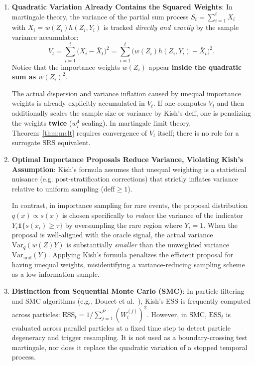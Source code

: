 \documentclass[11pt,a4paper]{article}
\begin{document}
\begin{enumerate}[leftmargin=*]
    \item \textbf{Quadratic Variation Already Contains the Squared Weights}:
    In martingale theory, the variance of the partial sum process $S_t = \sum_{i=1}^t X_i$ with $X_i = w(Z_i) h(Z_i, Y_i)$ is tracked \emph{directly and exactly} by the sample variance accumulator:
    \begin{equation}\label{eq:vt_exact}
    V_t = \sum_{i=1}^t \big( X_i - \bar{X}_t \big)^2 = \sum_{i=1}^t \Big( w(Z_i) h(Z_i, Y_i) - \bar{X}_t \Big)^2.
    \end{equation}
    Notice that the importance weights $w(Z_i)$ appear \textbf{inside the quadratic sum as $w(Z_i)^2$}. 
    
    The actual dispersion and variance inflation caused by unequal importance weights is already explicitly accumulated in $V_t$. If one computes $V_t$ and then additionally scales the sample size or variance by Kish's $\text{deff}$, one is penalizing the weights \textbf{twice} ($w_i^4$ scaling). In martingale limit theory, Theorem~\ref{thm:mclt} requires convergence of $V_t$ itself; there is no role for a surrogate SRS equivalent.
    
    \item \textbf{Optimal Importance Proposals Reduce Variance, Violating Kish's Assumption}:
    Kish's formula assumes that unequal weighting is a statistical nuisance (e.g. post-stratification corrections) that strictly inflates variance relative to uniform sampling ($\text{deff} \ge 1$). 
    
    In contrast, in importance sampling for rare events, the proposal distribution $q(x) \propto s(x)$ is chosen specifically to \emph{reduce} the variance of the indicator $Y_i \mathbf{1}\{s(x_i) \ge \tau\}$ by oversampling the rare region where $Y_i = 1$. When the proposal is well-aligned with the oracle signal, the actual variance $\text{Var}_q(w(Z) Y)$ is substantially \emph{smaller} than the unweighted variance $\text{Var}_{\text{unif}}(Y)$. Applying Kish's formula penalizes the efficient proposal for having unequal weights, misidentifying a variance-reducing sampling scheme as a low-information sample.
    
    \item \textbf{Distinction from Sequential Monte Carlo (SMC)}:
    In particle filtering and SMC algorithms (e.g., Doucet et al.~\cite{doucet2000sequential}), Kish's ESS is frequently computed across particles: $\text{ESS}_t = 1 / \sum_{j=1}^P (W_t^{(j)})^2$. However, in SMC, $\text{ESS}_t$ is evaluated across parallel particles at a fixed time step to detect particle degeneracy and trigger resampling. It is not used as a boundary-crossing test martingale, nor does it replace the quadratic variation of a stopped temporal process.
\end{enumerate}
\end{document}

